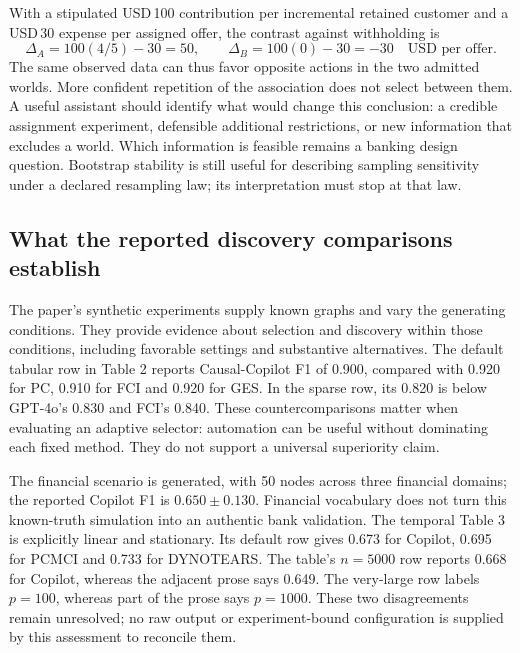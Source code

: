With a stipulated USD\,100 contribution per incremental retained customer and
a USD\,30 expense per assigned offer, the contrast against withholding is
\begin{equation}
 \Delta_A=100(4/5)-30=50,\qquad
 \Delta_B=100(0)-30=-30\quad\text{USD per offer}.
 \label{exec17:copilot-value}
\end{equation}
The same observed data can thus favor opposite actions in the two admitted
worlds. More confident repetition of the association does not select between
them. A useful assistant should identify what would change this conclusion:
a credible assignment experiment, defensible additional restrictions, or new
information that excludes a world. Which information is feasible remains a
banking design question. Bootstrap stability is still useful for describing
sampling sensitivity under a declared resampling law; its interpretation must
stop at that law.\citep{exec17_copilot_exact}

\subsection{What the reported discovery comparisons establish}

The paper's synthetic experiments supply known graphs and vary the generating
conditions. They provide evidence about selection and discovery within those
conditions, including favorable settings and substantive alternatives. The
default tabular row in Table 2 reports Causal-Copilot F1 of 0.900, compared with
0.920 for PC, 0.910 for FCI and 0.920 for GES. In the sparse row, its 0.820 is
below GPT-4o's 0.830 and FCI's 0.840. These countercomparisons matter when
evaluating an adaptive selector: automation can be useful without dominating
each fixed method. They do not support a universal superiority claim.
\citep{exec17_copilot_paper}

The financial scenario is generated, with 50 nodes across three financial
domains; the reported Copilot F1 is $0.650\pm0.130$. Financial vocabulary does
not turn this known-truth simulation into an authentic bank validation. The
temporal Table 3 is explicitly linear and stationary. Its default row gives
0.673 for Copilot, 0.695 for PCMCI and 0.733 for DYNOTEARS. The table's
$n=5000$ row reports 0.668 for Copilot, whereas the adjacent prose says 0.649.
The very-large row labels $p=100$, whereas part of the prose says $p=1000$.
These two disagreements remain unresolved; no raw output or experiment-bound
configuration is supplied by this assessment to reconcile them.
\citep{exec17_copilot_paper}

